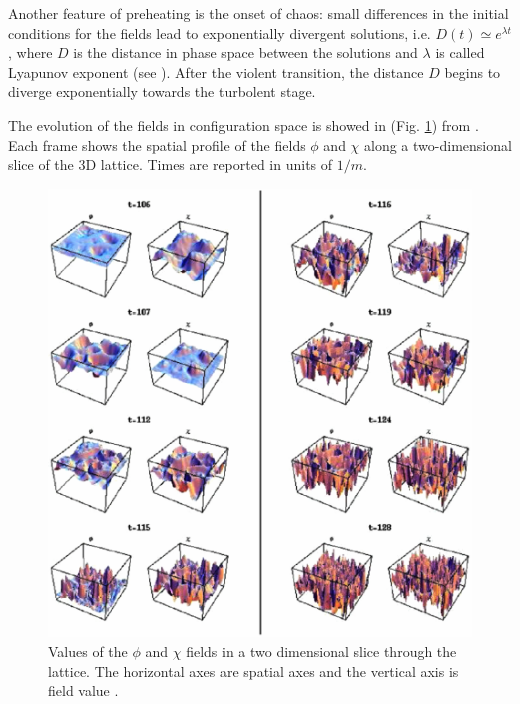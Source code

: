 \documentclass[11pt,a4paper,twoside]{book}
\begin{document}
Another feature of preheating is the onset of chaos: small differences in the initial conditions for the fields lead to exponentially divergent solutions, i.e. $D(t) \simeq e^{\lambda t} $, where $ D $ is the distance in phase space between the solutions and $\lambda$ is called Lyapunov exponent (see \cite{Chap5:Fragmentation}). After the violent transition, the distance $ D $ begins to diverge exponentially towards the turbolent stage.

The evolution of the fields in configuration space is showed in (Fig. \ref{fig:fragmentationfig4}) from \cite{Chap5:Fragmentation}. Each frame shows the spatial profile of the fields $\phi$ and $\chi$ along a two-dimensional slice of the 3D lattice. Times are reported in units of $ 1/m $.

\begin{figure}[h]
	\centering
	\includegraphics[width=0.75\linewidth, height=0.6\textheight]{Images/Chap5/Fragmentation_Fig4}
	\caption{Values of the $\phi$ and $\chi$ fields in a two dimensional slice through the lattice. The horizontal axes are spatial axes and the vertical axis is field value \cite{Chap5:Fragmentation}.}
	\label{fig:fragmentationfig4}
\end{figure}
\end{document}
